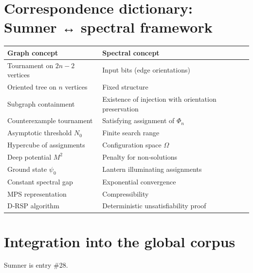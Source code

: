 \documentclass[11pt,a4paper]{article}
\begin{document}
\section{Correspondence dictionary: Sumner ↔ spectral framework}

\begin{center}
\small
\begin{tabular}{@{}l|l@{}}
\toprule
\textbf{Graph concept} & \textbf{Spectral concept} \\
\midrule
Tournament on $2n-2$ vertices & Input bits (edge orientations) \\
Oriented tree on $n$ vertices & Fixed structure \\
Subgraph containment & Existence of injection with orientation preservation \\
Counterexample tournament & Satisfying assignment of $\Phi_n$ \\
Asymptotic threshold $N_0$ & Finite search range \\
Hypercube of assignments & Configuration space $\Omega$ \\
Deep potential $M^2$ & Penalty for non‑solutions \\
Ground state $\psi_0$ & Lantern illuminating assignments \\
Constant spectral gap & Exponential convergence \\
MPS representation & Compressibility \\
D‑RSP algorithm & Deterministic unsatisfiability proof \\
\bottomrule
\end{tabular}
\end{center}

\section{Integration into the global corpus}

Sumner is entry \#28.
\end{document}
